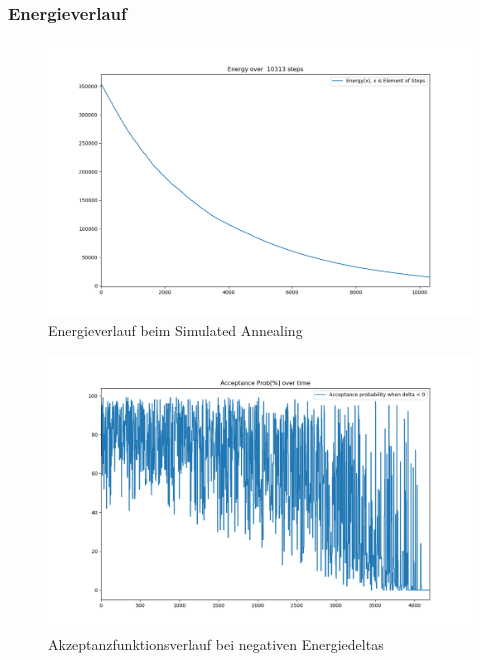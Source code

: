 \subsubsection{Energieverlauf}

\begin{figure}[H]\label{pic:Energy Annealing}
    \centering
    \includegraphics[width=\linewidth]{content/simulatedAnnealing/Bilder/Energy_10313_steps.png}
    \caption{Energieverlauf beim Simulated Annealing}
\end{figure}

\begin{figure}[H]\label{pic:Akzeptanzfunktionsverlauf}
    \centering
    \includegraphics[width=\linewidth]{content/simulatedAnnealing/Bilder/Acceptance_Probabilities over time 4195_steps_LinearyCooldownSchedule.png}
    \caption{Akzeptanzfunktionsverlauf bei negativen Energiedeltas}
\end{figure}






